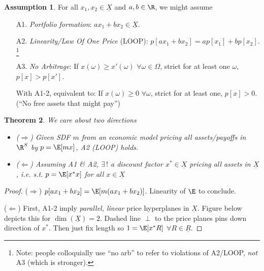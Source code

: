 \documentclass[12pt]{article}
\theoremstyle{plain}
\newtheorem{thm}{Theorem}[section]
\theoremstyle{definition}
\newtheorem{assump}[thm]{Assumption}
\theoremstyle{remark}
\begin{document}
\begin{multicols*}{2}
\begin{assump}
For all $x_1,x_2\in \underline{X}$ and $a,b\in\R$, we might assume
\begin{itemize}
  \item[A1.] \emph{Portfolio formation}:
    $ax_1+bx_2\in\underline{X}$.
  \item[A2.] \emph{Linearity/Law Of One Price} (LOOP):
    $p[ax_1+bx_2] = ap[x_1]+bp[x_2]$.
    \footnote{
      Note: people colloquially use ``no arb'' to refer to
      violations of A2/LOOP, \emph{not} A3 (which is stronger).
    }
  \item[A3.] \emph{No Arbitrage}:
    If $x(\omega)\geq x'(\omega)$ $\forall \omega\in\Omega$,
    strict for at least one $\omega$, $p[x]>p[x']$.

    With A1-2, equivalent to:
    If $x(\omega)\geq 0$ $\forall\omega$,
    strict for at least one, $p[x]>0$.
    (``No free assets that might pay'')
\end{itemize}
\end{assump}

\begin{thm}
We care about two directions
\begin{itemize}
  \item
    \emph{($\Rightarrow$)}
    Given SDF $m$ from an economic model pricing all assets/payoffs in
    $\R^S$ by $p=\E[mx]$, A2 (LOOP) holds.
  \item
    \emph{($\Leftarrow$)}
    Assuming A1 \& A2, $\exists\,!$ a discount factor
    $x^*\in\underline{X}$ pricing all assets in $\underline{X}$,
    i.e. s.t. $p=\E[x^*x]$ for all $x\in\underline{X}$
\end{itemize}
\end{thm}
\begin{proof}
($\Rightarrow$) $p[ax_1+bx_2] = \E[m(ax_1+bx_2)]$. Linearity of
$\E$ to conclude.

($\Leftarrow$) First, A1-2 imply \emph{parallel, linear} price
hyperplanes in $\underline{X}$.
Figure below depicts this for $\dim(\underline{X})=2$.
Dashed line $\perp$ to the price planes
pins down direction of $x^*$.
Then just fix length so $1=\E[x^*R]$ $\forall R\in\underline{R}$.

\vspace{10pt}

\end{proof}
\end{multicols*}
\end{document}
